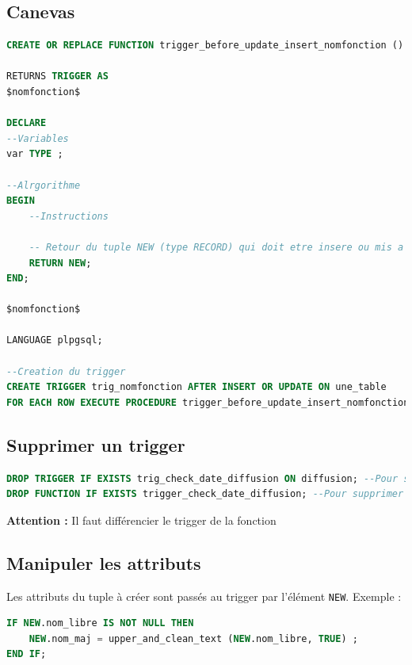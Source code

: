 \subsection{Canevas}
\begin{lstlisting}[language=SQL]
CREATE OR REPLACE FUNCTION trigger_before_update_insert_nomfonction ()

RETURNS TRIGGER AS
$nomfonction$

DECLARE
--Variables
var TYPE ;

--Alrgorithme
BEGIN
	--Instructions

	-- Retour du tuple NEW (type RECORD) qui doit etre insere ou mis a jour
	RETURN NEW;
END;

$nomfonction$

LANGUAGE plpgsql;

--Creation du trigger
CREATE TRIGGER trig_nomfonction AFTER INSERT OR UPDATE ON une_table
FOR EACH ROW EXECUTE PROCEDURE trigger_before_update_insert_nomfonction ();
\end{lstlisting}

\subsection{Supprimer un trigger}
\begin{lstlisting}[language=SQL]
DROP TRIGGER IF EXISTS trig_check_date_diffusion ON diffusion; --Pour supprimer le trigger sur une table
DROP FUNCTION IF EXISTS trigger_check_date_diffusion; --Pour supprimer la fonction/procédure
\end{lstlisting}
\textbf{Attention :} Il faut différencier le trigger de la fonction

\subsection{Manipuler les attributs}
Les attributs du tuple à créer sont passés au trigger par l'élément \texttt{NEW}. Exemple :
\begin{lstlisting}[language=SQL]
IF NEW.nom_libre IS NOT NULL THEN
	NEW.nom_maj = upper_and_clean_text (NEW.nom_libre, TRUE) ;
END IF;
\end{lstlisting}

